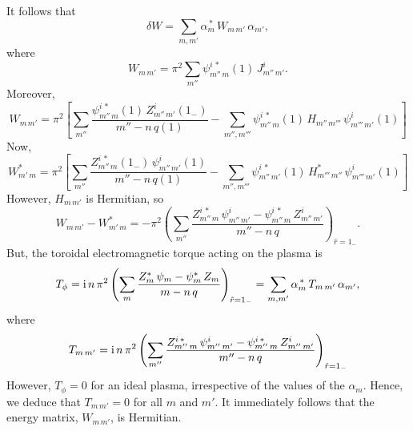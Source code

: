 \documentclass[12pt,prb,aps,notitlepage]{revtex4-1}
\begin{document}
It follows that
\begin{equation}
\delta W = \sum_{m,m'} \alpha_m^{\,\ast}\,W_{m\,m'}\,\alpha_{m'},
\end{equation}
where
\begin{equation}
W_{m\,m'} =\pi^2\sum_{m''} \psi_{m''\,m}^{i\,\ast}(1)\,J_{m''\,m'}^i.
\end{equation}
Moreover, 
\begin{equation}
W_{m\,m'} =\pi^2\left[\sum_{m''}\frac{\psi_{m''\,m}^{i\,\ast}(1)\,Z_{m''\,m'}^i(1_-)}{m''-n\,q(1)}
-\sum_{m'',m'''}\psi_{m''\,m}^{i\,\ast}(1)\,H_{m''\,m'''}\,\psi^i_{m'''\,m'}(1)\right]
\end{equation}
Now,
\begin{equation}
W_{m'\,m}^\ast =\pi^2\left[\sum_{m''}\frac{Z_{m''\,m}^{i\,\ast}(1_-)\,\psi_{m''\,m'}^i(1)}{m''-n\,q(1)}
-\sum_{m'',m'''}\psi_{m''\,m'}^{i\,\ast}(1)\,H^\ast_{m'''\,m''}\,\psi^i_{m'''\,m'}(1)\right]
\end{equation}
However, $H_{m\,m'}$ is Hermitian, so
\begin{equation}
W_{m\,m'}-W_{m'\,m}^\ast =-\pi^2\left(\sum_{m''} \frac{Z_{m''\,m}^{i\,\ast}\,\psi_{m''\,m'}^i -\psi_{m''\,m}^{i\,\ast}\,Z_{m''\,m'}^i}{m''-n\,q}\right)_{\hat{r}=1_-}.
\end{equation}
But, the toroidal electromagnetic torque acting on the plasma is
\begin{equation}
T_\phi={\rm i}\,n\,\pi^2\left(\sum_m\frac{Z_m^\ast\,\psi_m-\psi_m^\ast\,Z_m}{m-n\,q}\right)_{\hat{r}=1_{-}}=\sum_{m,m'}\alpha_m^{\,\ast}\,T_{m\,m'}\,\alpha_{m'},
\end{equation}
where
\begin{equation}
T_{m\,m'} = {\rm i}\,n\,\pi^2\left(\sum_{m''} \frac{Z_{m''\,m}^{i\,\ast}\,\psi_{m''\,m'}^i -\psi_{m''\,m}^{i\,\ast}\,Z_{m''\,m'}^i}{m''-n\,q}\right)_{\hat{r}=1_-}
\end{equation}
However, $T_\phi=0$ for an ideal plasma, irrespective of the values of the $\alpha_m$. Hence, we deduce that $T_{m\,m'}=0$ for all
$m$ and $m'$. It immediately follows that the energy matrix, $W_{m\,m'}$, is Hermitian. 
\end{document}

